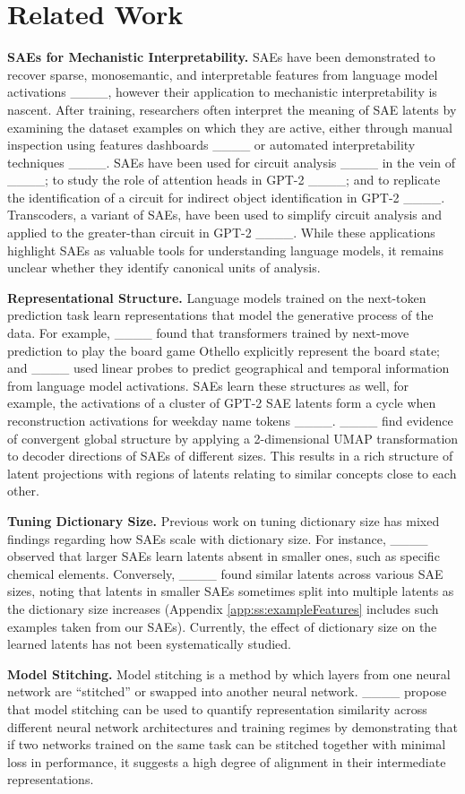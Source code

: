 \section{Related Work}
\textbf{SAEs for Mechanistic Interpretability.} SAEs have been demonstrated to recover sparse, monosemantic, and interpretable features from language model activations ____, however their application to mechanistic interpretability is nascent. After training, researchers often interpret the meaning of SAE latents by examining the dataset examples on which they are active, either through manual inspection using features dashboards ____ or automated interpretability techniques ____. SAEs have been used for circuit analysis ____ in the vein of ____; to study the role of attention heads in GPT-2 ____; and to replicate the identification of a circuit for indirect object identification in GPT-2 ____. Transcoders, a variant of SAEs, have been used to simplify circuit analysis and applied to the greater-than circuit in GPT-2 ____. While these applications highlight SAEs as valuable tools for understanding language models, it remains unclear whether they identify canonical units of analysis.


\textbf{Representational Structure.} Language models trained on the next-token prediction task learn representations that model the generative process of the data. For example, ____ found that transformers trained by next-move prediction to play the board game Othello explicitly represent the board state; and ____ used linear probes to predict geographical and temporal information from language model activations. SAEs learn these structures as well, for example, the activations of a cluster of GPT-2 SAE latents form a cycle when reconstruction activations for weekday name tokens ____. ____ find evidence of convergent global structure by applying a 2-dimensional UMAP transformation to decoder directions of SAEs of different sizes. This results in a rich structure of latent projections with regions of latents relating to similar concepts close to each other.

\textbf{Tuning Dictionary Size.} Previous work on tuning dictionary size has mixed findings regarding how SAEs scale with dictionary size. For instance, ____ observed that larger SAEs learn latents absent in smaller ones, such as specific chemical elements. Conversely, ____ found similar latents across various SAE sizes, noting that latents in smaller SAEs sometimes split into multiple latents as the dictionary size increases (Appendix \ref{app:ss:exampleFeatures} includes such examples taken from our SAEs). Currently, the effect of dictionary size on the learned latents has not been systematically studied.

\textbf{Model Stitching.} Model stitching is a method by which layers from one neural network are ``stitched'' or swapped into another neural network. ____ propose that model stitching can be used to quantify representation similarity across different neural network architectures and training regimes by demonstrating that if two networks trained on the same task can be stitched together with minimal loss in performance, it suggests a high degree of alignment in their intermediate representations.